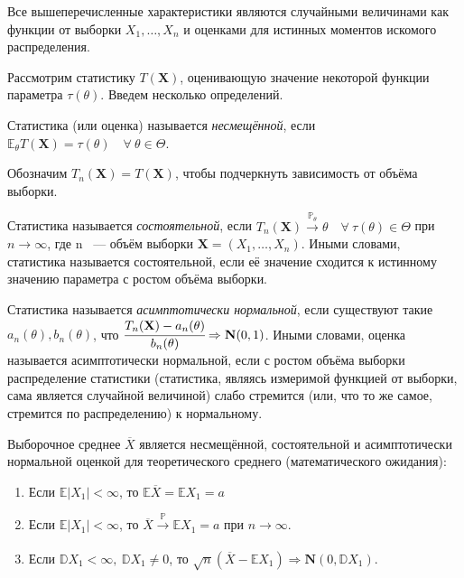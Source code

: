 Все вышеперечисленные характеристики являются случайными величинами как функции от выборки $X_{1}, \ldots, X_{n}$ и оценками для истинных моментов искомого распределения.

Рассмотрим статистику $T(\mathbf{X})$, оценивающую значение некоторой функции параметра $\tau(\theta)$. Введем несколько определений.

\begin{defn}
    Статистика (или оценка) называется {\it несмещённой}, если $\mathbb{E}_{\theta}T(\mathbf{X}) = \tau(\theta) \quad \forall ~ \theta \in \Theta$.
\end{defn}

Обозначим $T_n(\mathbf{X}) = T(\mathbf{X})$, чтобы подчеркнуть зависимость от объёма выборки.

\begin{defn}
    Статистика называется {\it состоятельной}, если $T_n(\mathbf{X}) \stackrel{\mathbb{P}_{\theta}}{\longrightarrow} \theta \quad \forall ~ \tau(\theta) \in \Theta$ при $n \to \infty$, где n ~--- объём выборки $\mathbf{X} = \left(X_1, \ldots, X_n\right)$. 
    Иными словами, статистика называется состоятельной, если её значение сходится к истинному значению параметра с ростом объёма выборки.
\end{defn}

\begin{defn}
    Статистика называется { \it асимптотически нормальной}, если существуют такие $a_n(\theta), b_n(\theta)$, что $\cfrac{T_n(\mathbf{X}) - a_n(\theta)}{b_n(\theta)} \Rightarrow \mathbf{N}(0, 1)$.
    Иными словами, оценка называется асимптотически нормальной, если с ростом объёма выборки распределение статистики (статистика, являясь измеримой функцией от выборки, сама является случайной величиной) слабо стремится (или, что то же самое, стремится по распределению) к нормальному.
\end{defn}

\begin{thm*}
Выборочное среднее $\overline{X}$ является несмещённой, состоятельной и асимптотически нормальной оценкой для теоретического среднего (математического ожидания):

\begin{enumerate}[label={\arabic*.}]
    \item Если $\mathbb{E}|X_{1}|<\infty$, то $\mathbb{E}\overline{X}=\mathbb{E} X_{1}=a$
    \item Если $\mathbb{E}|X_{1}|<\infty$, то $\overline{X} \xrightarrow[]{\mathbb{P}} \mathbb{E} X_{1}=a$ при $n \rightarrow \infty$.
    \item Если $\mathbb{D} X_{1}<\infty,~ \mathbb{D} X_{1} \neq 0$, то $\sqrt{n}(\overline{X}-\mathbb{E} X_{1}) \Rightarrow \mathbf{N}(0, \mathbb{D} X_{1})$.
\end{enumerate}
\end{thm*}

